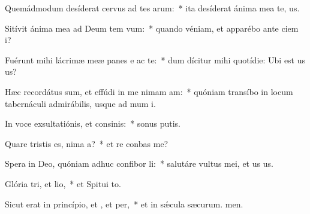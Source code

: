 \item Quemádmodum desíderat cervus ad tes arum:~* ita desíderat ánima mea  te, us.
\item Sitívit ánima mea ad Deum tem vum:~* quando véniam, et apparébo ante ciem i?
\item Fuérunt mihi lácrimæ meæ panes e ac te:~* dum dícitur mihi quotídie: Ubi est us us?
\item Hæc recordátus sum, et effúdi in me nimam am:~* quóniam transíbo in locum tabernáculi admirábilis, usque ad mum i.
\item In voce exsultatiónis, et consinis:~* sonus putis.
\item Quare tristis es, nima a?~* et re conbas me?
\item Spera in Deo, quóniam adhuc confibor li:~* salutáre vultus mei, et us us.
\item Glória tri, et lio,~* et Spitui to.
\item Sicut erat in princípio, et , et per,~* et in sǽcula sæcurum. men.

